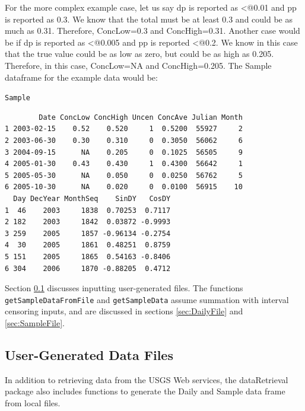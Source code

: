 \documentclass[a4paper,11pt]{article}\usepackage[]{graphicx}\usepackage[]{color}
\makeatletter
\newcommand{\hlstd}[1]{\textcolor[rgb]{0.345,0.345,0.345}{#1}}%
\newenvironment{kframe}{%
 \def\at@end@of@kframe{}%
 \ifinner\ifhmode%
  \def\at@end@of@kframe{\end{minipage}}%
  \begin{minipage}{\columnwidth}%
 \fi\fi%
 \def\FrameCommand##1{\hskip\@totalleftmargin \hskip-\fboxsep
 \colorbox{shadecolor}{##1}\hskip-\fboxsep
     \hskip-\linewidth \hskip-\@totalleftmargin \hskip\columnwidth}%
 \MakeFramed {\advance\hsize-\width
   \@totalleftmargin\z@ \linewidth\hsize
   \@setminipage}}%
 {\par\unskip\endMakeFramed%
 \at@end@of@kframe}
\newenvironment{knitrout}{}{} %
\makeatother
\begin{document}
For the more complex example case, let us say dp is reported as \verb@<@0.01 and pp is reported as 0.3. We know that the total must be at least 0.3 and could be as much as 0.31. Therefore, ConcLow=0.3 and ConcHigh=0.31. Another case would be if dp is reported as \verb@<@0.005 and pp is reported \verb@<@0.2. We know in this case that the true value could be as low as zero, but could be as high as 0.205. Therefore, in this case, ConcLow=NA and ConcHigh=0.205. The Sample dataframe for the example data would be:



\begin{knitrout}
\color{fgcolor}\begin{kframe}
\begin{alltt}
  \hlstd{Sample}
\end{alltt}
\begin{verbatim}
        Date ConcLow ConcHigh Uncen ConcAve Julian Month
1 2003-02-15    0.52    0.520     1  0.5200  55927     2
2 2003-06-30    0.30    0.310     0  0.3050  56062     6
3 2004-09-15      NA    0.205     0  0.1025  56505     9
4 2005-01-30    0.43    0.430     1  0.4300  56642     1
5 2005-05-30      NA    0.050     0  0.0250  56762     5
6 2005-10-30      NA    0.020     0  0.0100  56915    10
  Day DecYear MonthSeq    SinDY   CosDY
1  46    2003     1838  0.70253  0.7117
2 182    2003     1842  0.03872 -0.9993
3 259    2005     1857 -0.96134 -0.2754
4  30    2005     1861  0.48251  0.8759
5 151    2005     1865  0.54163 -0.8406
6 304    2006     1870 -0.88205  0.4712
\end{verbatim}
\end{kframe}
\end{knitrout}

Section \ref{sec:userFiles} discusses inputting user-generated files. The functions \texttt{getSampleDataFromFile} and \texttt{getSampleData} assume summation with interval censoring inputs, and are discussed in sections \ref{sec:DailyFile} and \ref{sec:SampleFile}.

\FloatBarrier

\subsection{User-Generated Data Files}
\label{sec:userFiles}
In addition to retrieving data from the USGS Web services, the dataRetrieval package also includes functions to generate the Daily and Sample data frame from local files.
\end{document}
